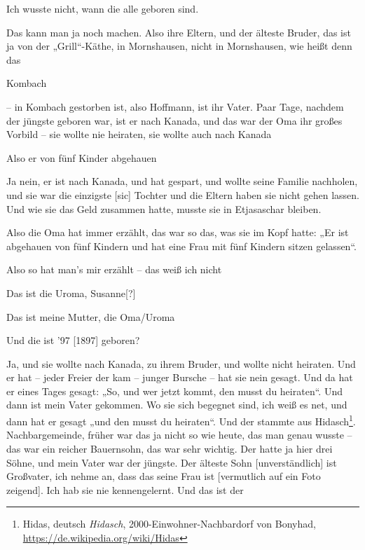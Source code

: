 \documentclass[ngerman,]{article}
\providecommand{\tightlist}{%
  \setlength{\itemsep}{0pt}\setlength{\parskip}{0pt}}
\begin{document}
\begin{multicols}{2}
\begin{description}
\tightlist
\item[Ruth]
Ich wusste nicht, wann die alle geboren sind.
\item[Käthe]
Das kann man ja noch machen. Also ihre Eltern, und der älteste Bruder,
das ist ja von der „Grill“-Käthe, in Mornshausen, nicht in Mornshausen,
wie heißt denn das
\item[Ruth]
Kombach
\item[Käthe]
– in Kombach gestorben ist, also Hoffmann, ist ihr Vater. Paar Tage,
nachdem der jüngste geboren war, ist er nach Kanada, und das war der Oma
ihr großes Vorbild – sie wollte nie heiraten, sie wollte auch nach
Kanada
\item[Ruth]
Also er von fünf Kinder abgehauen
\item[Käthe]
Ja nein, er ist nach Kanada, und hat gespart, und wollte seine Familie
nachholen, und sie war die einzigste {[}sic{]} Tochter und die Eltern
haben sie nicht gehen lassen. Und wie sie das Geld zusammen hatte,
musste sie in Etjasaschar bleiben.
\item[Ruth]
Also die Oma hat immer erzählt, das war so das, was sie im Kopf hatte:
„Er ist abgehauen von fünf Kindern und hat eine Frau mit fünf Kindern
sitzen gelassen“.
\item[Käthe]
Also so hat man's mir erzählt – das weiß ich nicht
\item[Ruth]
Das ist die Uroma, Susanne{[}?{]}
\item[Käthe]
Das ist meine Mutter, die Oma/Uroma
\item[Ruth]
Und die ist '97 {[}1897{]} geboren?
\item[Käthe]
Ja, und sie wollte nach Kanada, zu ihrem Bruder, und wollte nicht
heiraten. Und er hat – jeder Freier der kam – junger Bursche – hat sie
nein gesagt. Und da hat er eines Tages gesagt: „So, und wer jetzt kommt,
den musst du heiraten“. Und dann ist mein Vater gekommen. Wo sie sich
begegnet sind, ich weiß es net, und dann hat er gesagt „und den musst du
heiraten“. Und der stammte aus Hidasch\footnote{Hidas, deutsch
  \emph{Hidasch}, 2000-Einwohner-Nachbardorf von Bonyhad,
  \url{https://de.wikipedia.org/wiki/Hidas}}. Nachbargemeinde, früher
war das ja nicht so wie heute, das man genau wusste – das war ein
reicher Bauernsohn, das war sehr wichtig. Der hatte ja hier drei Söhne,
und mein Vater war der jüngste. Der älteste Sohn {[}unverständlich{]}
ist Großvater, ich nehme an, dass das seine Frau ist {[}vermutlich auf
ein Foto zeigend{]}. Ich hab sie nie kennengelernt. Und das ist der

\end{description}
\end{multicols}
\end{document}
